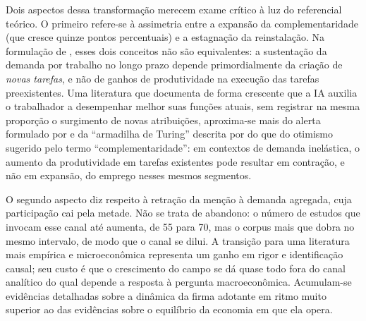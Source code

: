 Dois aspectos dessa transformação merecem exame crítico à luz do referencial teórico. O primeiro refere-se à assimetria entre a expansão da complementaridade (que cresce quinze pontos percentuais) e a estagnação da reinstalação. Na formulação de \textcite{acemogluRestrepo2019}, esses dois conceitos não são equivalentes: a sustentação da demanda por trabalho no longo prazo depende primordialmente da criação de \emph{novas tarefas}, e não de ganhos de produtividade na execução das tarefas preexistentes. Uma literatura que documenta de forma crescente que a IA auxilia o trabalhador a desempenhar melhor suas funções atuais, sem registrar na mesma proporção o surgimento de novas atribuições, aproxima-se mais do alerta formulado por \textcite{acemogluRestrepo2020wrongai} e da ``armadilha de Turing'' descrita por \textcite{brynjolfsson2022turing} do que do otimismo sugerido pelo termo ``complementaridade'': em contextos de demanda inelástica, o aumento da produtividade em tarefas existentes pode resultar em contração, e não em expansão, do emprego nesses mesmos segmentos.

O segundo aspecto diz respeito à retração da menção à demanda agregada, cuja participação cai pela metade. Não se trata de abandono: o número de estudos que invocam esse canal até aumenta, de 55 para 70, mas o corpus mais que dobra no mesmo intervalo, de modo que o canal se dilui. A transição para uma literatura mais empírica e microeconômica representa um ganho em rigor e identificação causal; seu custo é que o crescimento do campo se dá quase todo fora do canal analítico do qual depende a resposta à pergunta macroeconômica. Acumulam-se evidências detalhadas sobre a dinâmica da firma adotante em ritmo muito superior ao das evidências sobre o equilíbrio da economia em que ela opera.

